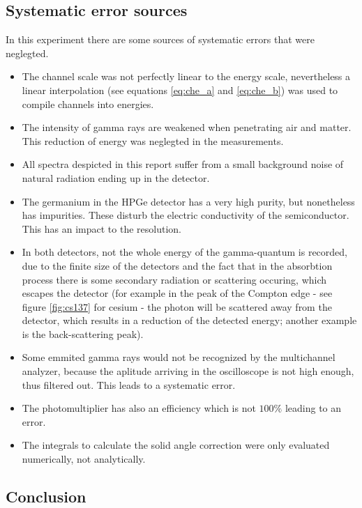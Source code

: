 \documentclass[a4paper]{article}
\begin{document}
\subsection{Systematic error sources}

In this experiment there are some sources of systematic errors that were neglegted.

\begin{itemize}
\item The channel scale was not perfectly linear to the energy scale, nevertheless a linear interpolation (see equations \eqref{eq:che_a} and \eqref{eq:che_b}) was used to compile channels into energies.
\item The intensity of gamma rays are weakened when penetrating air and matter. This reduction of energy was neglegted in the measurements.
\item All spectra despicted in this report suffer from a small background noise of natural radiation ending up in the detector.
\item The germanium in the HPGe detector has a very high purity, but nonetheless has impurities. These disturb the electric conductivity of the semiconductor. This has an impact to the resolution.
\item In both detectors, not the whole energy of the gamma-quantum is recorded, due to the finite size of the detectors and the fact that in the absorbtion process there is some secondary radiation or scattering occuring, which escapes the detector (for example in the peak of the Compton edge - see figure \ref{fig:cs137} for cesium - the photon will be scattered away from the detector, which results in a reduction of the detected energy; another example is the back-scattering peak).
\item Some emmited gamma rays would not be recognized by the multichannel analyzer, because the aplitude arriving in the oscilloscope is not high enough, thus filtered out. This leads to a systematic error.
\item The photomultiplier has also an efficiency which is not $100 \%$ leading to an error.
\item The integrals to calculate the solid angle correction were only evaluated numerically, not analytically.
\end{itemize}

\subsection{Conclusion}
\end{document}
